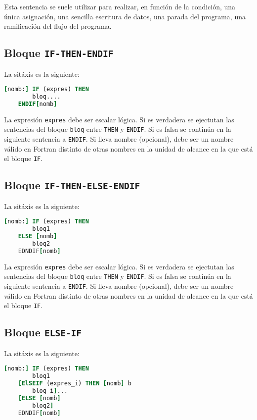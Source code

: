 Esta sentencia se suele utilizar para realizar, en función de la condición, una única asignación, una sencilla escritura de datos, una parada del programa, una ramificación del flujo del programa.

\subsection{Bloque {\tt IF-THEN-ENDIF}}

La sitáxis es la siguiente:

\begin{lstlisting}[language=Fortran]
	[nomb:] IF (expres) THEN 
		bloq....
	ENDIF[nomb]
\end{lstlisting}

La expresión \texttt{expres} debe ser escalar lógica. Si es verdadera se ejectutan las sentencias del bloque \texttt{bloq} entre \texttt{THEN} y \texttt{ENDIF}. Si es falsa se continúa en la siguiente sentencia a \texttt{ENDIF}. Si lleva nombre (opcional), debe ser un nombre válido en Fortran distinto de otras nombres en la unidad de alcance en la que está el bloque \texttt{IF}.


\subsection{Bloque {\tt IF-THEN-ELSE-ENDIF}}
La sitáxis es la siguiente:

\begin{lstlisting}[language=Fortran]
	[nomb:] IF (expres) THEN 
		bloq1 
	ELSE [nomb] 
		bloq2 
	EDNDIF[nomb] 
\end{lstlisting}

La expresión \texttt{expres} debe ser escalar lógica. Si es verdadera se ejectutan las sentencias del bloque \texttt{bloq} entre \texttt{THEN} y \texttt{ENDIF}. Si es falsa se continúa en la siguiente sentencia a \texttt{ENDIF}. Si lleva nombre (opcional), debe ser un nombre válido en Fortran distinto de otras nombres en la unidad de alcance en la que está el bloque \texttt{IF}.


\subsection{Bloque {\tt ELSE-IF}}

La sitáxis es la siguiente:

\begin{lstlisting}[language=Fortran]
	[nomb:] IF (expres) THEN 
		bloq1 
	[ElSEIF (expres_i) THEN [nomb] b
		bloq_i]...
	[ELSE [nomb]
		bloq2]
	EDNDIF[nomb] 
\end{lstlisting}

